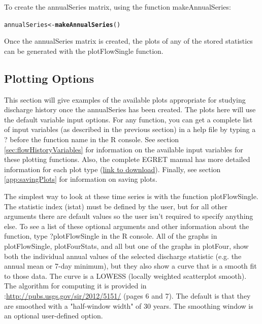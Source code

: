 \documentclass[a4paper,11pt]{article}\usepackage[]{graphicx}\usepackage[]{color}
\makeatletter
\newcommand{\hlstd}[1]{\textcolor[rgb]{0.345,0.345,0.345}{#1}}%
\newcommand{\hlkwb}[1]{\textcolor[rgb]{0.69,0.353,0.396}{#1}}%
\newcommand{\hlkwd}[1]{\textcolor[rgb]{0.737,0.353,0.396}{\textbf{#1}}}%
\newenvironment{kframe}{%
 \def\at@end@of@kframe{}%
 \ifinner\ifhmode%
  \def\at@end@of@kframe{\end{minipage}}%
  \begin{minipage}{\columnwidth}%
 \fi\fi%
 \def\FrameCommand##1{\hskip\@totalleftmargin \hskip-\fboxsep
 \colorbox{shadecolor}{##1}\hskip-\fboxsep
     \hskip-\linewidth \hskip-\@totalleftmargin \hskip\columnwidth}%
 \MakeFramed {\advance\hsize-\width
   \@totalleftmargin\z@ \linewidth\hsize
   \@setminipage}}%
 {\par\unskip\endMakeFramed%
 \at@end@of@kframe}
\newenvironment{knitrout}{}{} %
\makeatother
\begin{document}
To create the annualSeries matrix, using the function makeAnnualSeries:
\begin{knitrout}
\color{fgcolor}\begin{kframe}
\begin{alltt}
\hlstd{annualSeries} \hlkwb{<-} \hlkwd{makeAnnualSeries}\hlstd{()}
\end{alltt}
\end{kframe}
\end{knitrout}


Once the annualSeries matrix is created, the plots of any of the stored statistics can be generated with the plotFlowSingle function.

\FloatBarrier

\subsection{Plotting Options}
\label{sec:plotOptions}

\FloatBarrier

This section will give examples of the available plots appropriate for studying discharge history once the annualSeries has been created. The plots here will use the default variable input options.  For any function, you can get a complete list of input variables (as described in the previous section) in a help file by typing a ? before the function name in the R console. See section \ref{sec:flowHistoryVariables} for information on the available input variables for these plotting functions. Also, the complete EGRET manual has more detailed information for each plot type (\href{https://github.com/USGS-R/EGRET/raw/Documentation/EGRET%2Bmanual_4.doc}{link to download}). Finally, see section \ref{app:savingPlots} for information on saving plots.

The simplest way to look at these time series is with the function plotFlowSingle. The statistic index (istat) must be defined by the user, but for all other arguments there are default values so the user isn't required to specify anything else. To see a list of these optional arguments and other information about the function, type ?plotFlowSingle in the R console. All of the graphs in plotFlowSingle, plotFourStats, and all but one of the graphs in plotFour, show both the individual annual values of the selected discharge statistic (e.g. the annual mean or 7-day minimum), but they also show a curve that is a smooth fit to those data.  The curve is a LOWESS (locally weighted scatterplot smooth).  The algorithm for computing it is provided in \cite{HirschV}:\url{http://pubs.usgs.gov/sir/2012/5151/}  (pages 6 and 7).  The default is that they are smoothed with a "half-window width" of 30 years.  The smoothing window is an optional user-defined option. 
\end{document}
